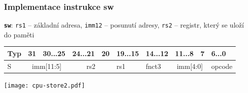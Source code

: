 \documentclass{beamer}
\begin{document}
\begin{frame}[shrink=18]
\frametitle{Implementace instrukce sw}

\textbf{\texttt{sw}}: \texttt{rs1} -- základní adresa, \texttt{imm12} -- posunutí adresy, \texttt{rs2} -- registr, který se uloží do paměti

\bigskip

\begin{table}
\footnotesize
\begin{tabular}{|m{0.4cm}|m{0.4cm}|m{1.0cm}|m{1.0cm}|m{0.4cm}|m{1.0cm}|m{1.0cm}|m{1.0cm}|m{0.4cm}|m{1.0cm}|}\hline
Typ & 31 & 30...25 & 24...21 & 20 & 19...15 & 14...12 & 11...8 & 7 & 6...0 \\ \hline
S & \multicolumn{2}{c|}{ imm[11:5] } & \multicolumn{2}{c|}{ rs2 } & rs1 & fnct3 &\multicolumn{2}{c|}{ imm[4:0] } & opcode\\ \hline
\end{tabular}
\end{table}

\bigskip

\texttt{[image: cpu-store2.pdf]}

\end{frame}
\end{document}
